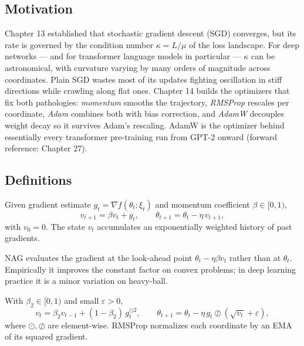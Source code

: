 \subsection*{Motivation}

Chapter 13 established that stochastic gradient descent (SGD) converges, but its rate is governed by the condition number $\kappa = L/\mu$ of the loss landscape. For deep networks --- and for transformer language models in particular --- $\kappa$ can be astronomical, with curvature varying by many orders of magnitude across coordinates. Plain SGD wastes most of its updates fighting oscillation in stiff directions while crawling along flat ones. Chapter 14 builds the optimizers that fix both pathologies: \emph{momentum} smooths the trajectory, \emph{RMSProp} rescales per coordinate, \emph{Adam} combines both with bias correction, and \emph{AdamW} decouples weight decay so it survives Adam's rescaling. AdamW is the optimizer behind essentially every transformer pre-training run from GPT-2 onward (forward reference: Chapter 27).

\subsection*{Definitions}

\begin{definition}
Given gradient estimate $g_t = \nabla f(\theta_t; \xi_t)$ and momentum coefficient $\beta \in [0,1)$,
\[
v_{t+1} = \beta v_t + g_t, \qquad \theta_{t+1} = \theta_t - \eta\, v_{t+1},
\]
with $v_0 = 0$. The state $v_t$ accumulates an exponentially weighted history of past gradients.
\end{definition}

\begin{definition}
NAG evaluates the gradient at the look-ahead point $\theta_t - \eta\beta v_t$ rather than at $\theta_t$. Empirically it improves the constant factor on convex problems; in deep learning practice it is a minor variation on heavy-ball.
\end{definition}

\begin{definition}[RMSProp]
With $\beta_2 \in [0,1)$ and small $\varepsilon > 0$,
\[
v_t = \beta_2 v_{t-1} + (1-\beta_2)\, g_t^{\odot 2}, \qquad \theta_{t+1} = \theta_t - \eta\, g_t \oslash (\sqrt{v_t} + \varepsilon),
\]
where $\odot,\oslash$ are element-wise. RMSProp normalizes each coordinate by an EMA of its squared gradient.
\end{definition}

